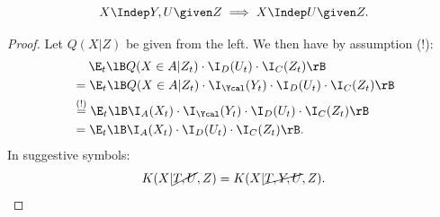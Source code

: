 \begin{Lem}
    \[X \Indep  Y,U \given Z \implies X \Indep  U \given Z.\]
\begin{proof}
    Let $Q(X|Z)$ be given from the left. We then have by assumption (!):
    \begin{align*}                  
      & \quad\; \E_t\lB Q( X \in A| Z_t) \cdot\I_D(U_t) \cdot \I_C(Z_t) \rB \\
      & = \E_t\lB Q( X \in A| Z_t) \cdot \I_\Ycal(Y_t) \cdot\I_D(U_t) \cdot \I_C(Z_t) \rB \\
      & \stackrel{(!)}{=} \E_t\lB \I_A(X_t) \cdot \I_\Ycal(Y_t) \cdot\I_D(U_t)  \cdot \I_C(Z_t) \rB \\
      & = \E_t\lB \I_A(X_t) \cdot\I_D(U_t) \cdot \I_{C}(Z_t) \rB.
    \end{align*}
In suggestive symbols:
\[ K(X|\cancel{T,U},Z) = K(X|\cancel{T,Y,U},Z). \]
\end{proof}
\end{Lem}


